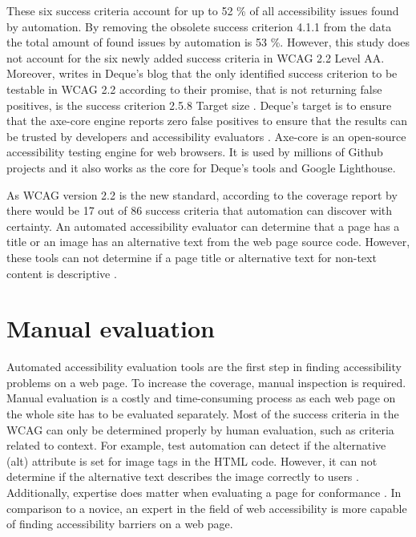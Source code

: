 These six success criteria account for up to 52 \% of all accessibility issues found by automation. By removing the obsolete success criterion 4.1.1 from the data the total amount of found issues by automation is 53 \%. However, this study does not account for the six newly added success criteria in WCAG 2.2 Level AA. Moreover, \textcite{dequeaxe4_5} writes in Deque's blog that the only identified success criterion to be testable in WCAG 2.2 according to their promise, that is not returning false positives, is the success criterion 2.5.8 Target size \citep{dequeaxe4_5}. Deque's target is to ensure that the axe-core engine reports zero false positives to ensure that the results can be trusted by developers and accessibility evaluators \citep{dequecoverage}. Axe-core is an open-source accessibility testing engine for web browsers. It is used by millions of Github projects and it also works as the core for Deque's tools and Google Lighthouse. 

As WCAG version 2.2 is the new standard, according to the coverage report by \textcite{dequecoverage} there would be 17 out of 86 success criteria that automation can discover with certainty. An automated accessibility evaluator can determine that a page has a title or an image has an alternative text from the web page source code. However, these tools can not determine if a page title or alternative text for non-text content is descriptive \citep{wcag_checklist}.

\section{Manual evaluation}

Automated accessibility evaluation tools are the first step in finding accessibility problems on a web page. To increase the coverage, manual inspection is required. Manual evaluation is a costly and time-consuming process as each web page on the whole site has to be evaluated separately. Most of the success criteria in the WCAG can only be determined properly by human evaluation, such as criteria related to context. For example, test automation can detect if the alternative (alt) attribute is set for image tags in the HTML code. However, it can not determine if the alternative text describes the image correctly to users \citep{comparison_10.1145/3371300.3383346}. Additionally, expertise does matter when evaluating a page for conformance \citep{10.1145/1878803.1878813_testability_expertise, comparative_accessibility_methods}. In comparison to a novice, an expert in the field of web accessibility is more capable of finding accessibility barriers on a web page.

